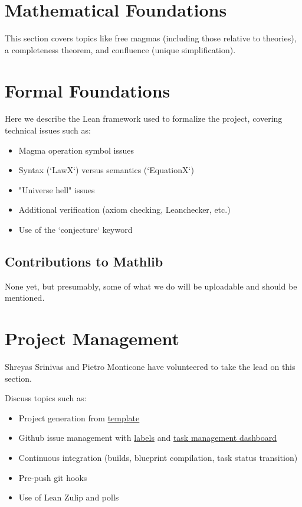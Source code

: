 \documentclass[12pt]{article}
\theoremstyle{definition}
\begin{document}
\section{Mathematical Foundations}
This section covers topics like free magmas (including those relative to theories), a completeness theorem, and confluence (unique simplification).

\section{Formal Foundations}
Here we describe the Lean framework used to formalize the project, covering technical issues such as:

\begin{itemize}
    \item Magma operation symbol issues
    \item Syntax (`LawX`) versus semantics (`EquationX`)
    \item "Universe hell" issues
    \item Additional verification (axiom checking, Leanchecker, etc.)
    \item Use of the `conjecture` keyword
\end{itemize}

\subsection{Contributions to Mathlib}
None yet, but presumably, some of what we do will be uploadable and should be mentioned.

\section{Project Management}
Shreyas Srinivas and Pietro Monticone have volunteered to take the lead on this section.

Discuss topics such as:
\begin{itemize}
    \item Project generation from \href{https://github.com/pitmonticone/LeanProject}{template}
    \item Github issue management with \href{https://github.com/teorth/equational_theories/labels}{labels} and \href{https://github.com/users/teorth/projects/1}{task management dashboard}
    \item Continuous integration (builds, blueprint compilation, task status transition)
    \item Pre-push git hooks
    \item Use of Lean Zulip and polls
\end{itemize}
\end{document}
